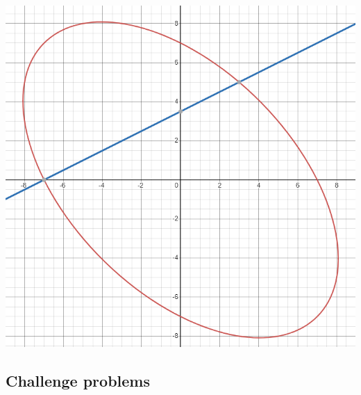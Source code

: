 \begin{enumerate}
\begin{center}
\includegraphics[scale=0.5]{graphing-line-ellipse.png}
\end{center}
\end{enumerate}

\subsection{Challenge problems}

